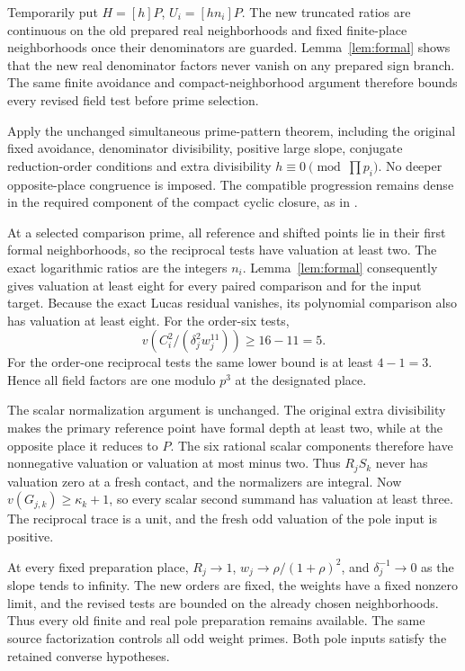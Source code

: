 \documentclass[11pt,a4paper]{article}
\begin{document}
Temporarily put \(H=[h]P\), \(U_i=[hn_i]P\).
The new truncated ratios are continuous on the old prepared real
neighborhoods and fixed finite-place neighborhoods once their
denominators are guarded. Lemma~\ref{lem:formal} shows that the new
real denominator factors never vanish on any prepared sign branch.
The same finite avoidance and compact-neighborhood argument therefore
bounds every revised field test before prime selection.

Apply the unchanged simultaneous prime-pattern theorem, including the
original fixed avoidance, denominator divisibility, positive large
slope, conjugate reduction-order conditions and extra divisibility
\(h\equiv0\pmod{\prod p_i}\). No deeper opposite-place congruence
is imposed. The compatible progression remains dense in the required
component of the compact cyclic closure, as in \cite{Unit}.

At a selected comparison prime, all reference and shifted points lie
in their first formal neighborhoods, so the reciprocal tests have
valuation at least two. The exact logarithmic ratios are the integers
\(n_i\). Lemma~\ref{lem:formal} consequently gives valuation at least
eight for every paired comparison and for the input target.
Because the exact Lucas residual vanishes, its polynomial comparison
also has valuation at least eight. For the order-six tests,
\[
 v\left(C_i^2/(\delta_j^2w_j^{11})\right)\ge16-11=5.
\]
For the order-one reciprocal tests the same lower bound is at least
\(4-1=3\). Hence all field factors are one modulo \(p^3\) at the
designated place.

The scalar normalization argument is unchanged. The original extra
divisibility makes the primary reference point have formal depth at
least two, while at the opposite place it reduces to \(P\).
The six rational scalar components therefore have nonnegative
valuation or valuation at most minus two. Thus \(R_jS_k\) never has
valuation zero at a fresh contact, and the normalizers are integral.
Now \(v(G_{j,k})\ge\kappa_k+1\), so every scalar second summand has
valuation at least three. The reciprocal trace is a unit, and the
fresh odd valuation of the pole input is positive.

At every fixed preparation place, \(R_j\to1\),
\(w_j\to\rho/(1+\rho)^2\), and \(\delta_j^{-1}\to0\) as the slope
tends to infinity. The new orders are fixed, the weights have a fixed
nonzero limit, and the revised tests are bounded on the already chosen
neighborhoods. Thus every old finite and real pole preparation remains
available. The same source factorization controls all odd weight primes.
Both pole inputs satisfy the retained converse hypotheses.
\end{document}
